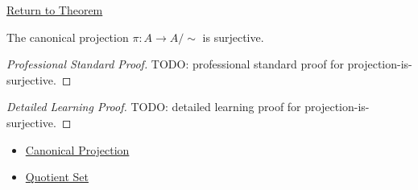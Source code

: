 \newpage
{}
\label{prf:projection-is-surjective}

\begin{remark*}[Return]
\hyperref[prop:projection-is-surjective]{Return to Theorem}
\end{remark*}

\begin{proposition*}
The canonical projection $\pi:A\to A/{\sim}$ is surjective.
\end{proposition*}

\begin{proof}[Professional Standard Proof]
\LRAProofBodyStart
TODO: professional standard proof for projection-is-surjective.
\end{proof}

\begin{proof}[Detailed Learning Proof]
\LRAProofBodyStart
TODO: detailed learning proof for projection-is-surjective.
\end{proof}

\begin{remark*}
\end{remark*}

\begin{dependencies}
\begin{itemize}
  \item \hyperref[def:canonical-projection]{Canonical Projection}
  \item \hyperref[def:quotient-set]{Quotient Set}
\end{itemize}
\end{dependencies}

\clearpage
